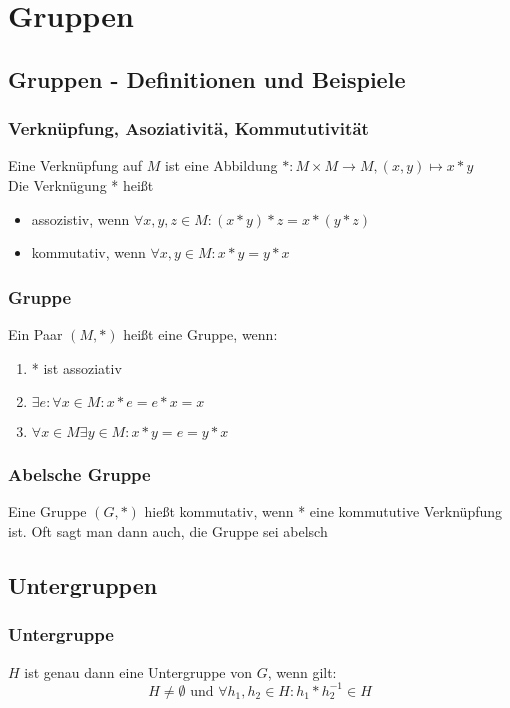 \documentclass{kit}
\begin{document}
\section{Gruppen}
  \subsection{Gruppen - Definitionen und Beispiele}
    \subsubsection{Verknüpfung, Asoziativitä, Kommututivität}
      Eine Verknüpfung auf $M$ ist eine Abbildung $*:M\times M\longrightarrow M,(x,y)\mapsto x*y$\\
      Die Verknügung * heißt
      \begin{itemize}
        \item assozistiv, wenn $\forall x,y,z\in M:(x*y)*z=x*(y*z)$
        \item kommutativ, wenn $\forall x,y\in M:x*y=y*x$
      \end{itemize}
    \subsubsection{Gruppe}
      Ein Paar $(M,*)$ heißt eine Gruppe, wenn:
      \begin{enumerate}[label=\roman*]
        \item * ist assoziativ
        \item $\exists e:\forall x\in M:x*e=e*x=x$
        \item $\forall x\in M\exists y\in M: x*y=e=y*x$
      \end{enumerate}
    \subsubsection{Abelsche Gruppe}
      Eine Gruppe $(G,*)$ hießt kommutativ, wenn * eine kommututive Verknüpfung ist.  Oft sagt man dann auch, die Gruppe sei abelsch
  \subsection{Untergruppen}
    \subsubsection{Untergruppe}
      $H$ ist genau dann eine Untergruppe von $G$, wenn gilt:
      \[H\neq\emptyset\text{ und }\forall h_1,h_2\in H:h_1*h_2^{-1}\in H\]
\end{document}
